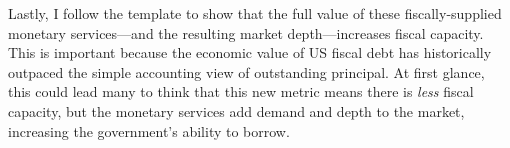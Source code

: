 \documentclass[11pt,a4paper,margin=1.5in]{article}
\begin{document}


Lastly, I follow the \citet{Brunnermeier-Merkel-Sannikov:2022} template to show that the full value of these fiscally-supplied monetary services---and the resulting market depth---increases fiscal capacity.
This is important because the economic value of US fiscal debt has historically outpaced the simple accounting view of outstanding principal.
At first glance, this could lead many to think that this new metric means there is {\em less} fiscal capacity, but the monetary services add demand and depth to the market, increasing the government's ability to borrow.
\end{document}
